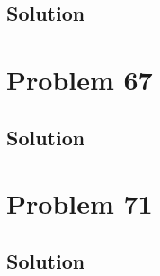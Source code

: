 \documentclass[12pt]{article}
\begin{document}
        \subsection{Solution}

    \pagebreak
    \section{Problem 67}

        \subsection{Solution}

    \pagebreak
    \section{Problem 71}

        \subsection{Solution}

    \pagebreak

    \tableofcontents
\end{document}
